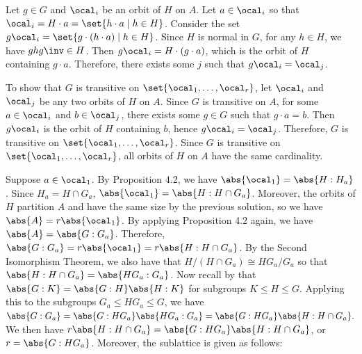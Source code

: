 \begin{solenum}
	\item Let $g \in G$ and $\ocal_i$ be an orbit of $H$ on $A$.
	Let $a \in \ocal_i$ so that $\ocal_i = H \cdot a = \set{h \cdot a \mid h \in H}$.
	Consider the set $g\ocal_i = \set{g \cdot (h \cdot a) \mid h \in H}$.
	Since $H$ is normal in $G$, for any $h \in H$, we have $ghg\inv \in H$.
	Then $g\ocal_i = H \cdot (g \cdot a)$, which is the orbit of $H$ containing $g \cdot a$.
	Therefore, there exists some $j$ such that $g\ocal_i = \ocal_j$.
	
	To show that $G$ is transitive on $\set{\ocal_1, \ldots, \ocal_r}$, let $\ocal_i$ and $\ocal_j$ be any two orbits of $H$ on $A$.
	Since $G$ is transitive on $A$, for some $a \in \ocal_i$ and $b \in \ocal_j$, there exists some $g \in G$ such that $g \cdot a = b$.
	Then $g\ocal_i$ is the orbit of $H$ containing $b$, hence $g\ocal_i = \ocal_j$.
	Therefore, $G$ is transitive on $\set{\ocal_1, \ldots, \ocal_r}$.
	Since $G$ is transitive on $\set{\ocal_1, \ldots, \ocal_r}$, all orbits of $H$ on $A$ have the same cardinality.
	\item Suppose $a \in \ocal_1$.
	By Proposition 4.2, we have $\abs{\ocal_1} = \abs{H : H_a}$.
	Since $H_a = H \cap G_a$, $\abs{\ocal_1} = \abs{H : H \cap G_a}$.
	Moreover, the orbits of $H$ partition $A$ and have the same size by the previous solution, so we have $\abs{A} = r\abs{\ocal_1}$.
	By applying Proposition 4.2 again, we have $\abs{A} = \abs{G : G_a}$.
	Therefore, $\abs{G : G_a} = r\abs{\ocal_1} = r\abs{H : H \cap G_a}$.
	By the Second Isomorphism Theorem, we also have that $H/(H \cap G_a) \cong HG_a/G_a$ so that $\abs{H : H \cap G_a} = \abs{HG_a : G_a}$.
	Now recall by  that $\abs{G : K} = \abs{G : H}\abs{H : K}$ for subgroups $K \leq H \leq G$.
	Applying this to the subgroups $G_a \leq HG_a \leq G$, we have $\abs{G : G_a} = \abs{G : HG_a}\abs{HG_a : G_a} = \abs{G : HG_a}\abs{H : H \cap G_a}.$ We then have $r\abs{H : H \cap G_a} = \abs{G : HG_a}\abs{H : H \cap G_a}$, or $r = \abs{G : HG_a}$.
	Moreover, the sublattice is given as follows:
	\begin{center}
	\end{center}
\end{solenum}

